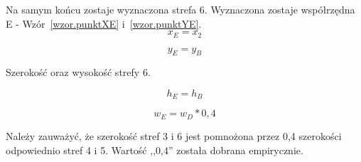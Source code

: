 \documentclass[a4paper,twoside,12pt]{book}
\begin{document}
    Na samym końcu zostaje wyznaczona strefa 6.
    Wyznaczona zostaje współrzędna E - Wzór~\ref{wzor.punktXE} i~\ref{wzor.punktYE}.
    \large
    \begin{equation}
        x_{E}=x_{2}
        \label{wzor.punktXE}
    \end{equation}
    \normalsize

    \large
    \begin{equation}
        y_{E}= y_{B}
        \label{wzor.punktYE}
    \end{equation}

    Szerokość oraz wysokość strefy 6.

    \large
    \begin{equation}
        h_{E}=h_{B}
        \label{wzor.punktHE}
    \end{equation}
    \normalsize

    \large
    \begin{equation}
        w_{E}= w_{D} * 0,4
        \label{wzor.punktWE}
    \end{equation}
    \normalsize

    Należy zauważyć, że szerokość stref 3 i 6 jest pomnożona przez 0,4 szerokości odpowiednio
    stref 4 i 5.
    Wartość ,,0,4'' została dobrana empirycznie.
\end{document}
